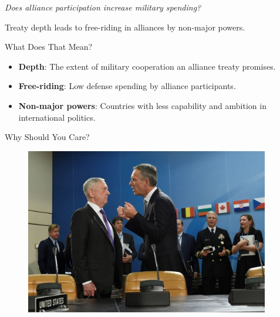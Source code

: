 \documentclass[12pt]{beamer}
\begin{document}

\begin{frame}[standout]

\huge \textit{Does alliance participation increase military spending?} 

\end{frame}

 \begin{frame}[standout]

Treaty depth leads to free-riding in alliances by non-major powers.  

 \end{frame}
 
 
 \begin{frame}{What Does That Mean?} 

\begin{itemize}
\item \textbf{Depth}: The extent of military cooperation an alliance treaty promises.
\pause  
\item \textbf{Free-riding}: Low defense spending by alliance participants. 
\pause 
\item \textbf{Non-major powers}: Countries with less capability and ambition in international politics. 
\end{itemize}

 \end{frame}
 
 
 

\begin{frame}{Why Should You Care?}

\begin{figure}[htbp]
	\centering
		\includegraphics[width=0.95\textwidth]{mattis-nato.jpg}
	\label{fig:mattis-nato}
\end{figure}


\end{frame}
\end{document}

